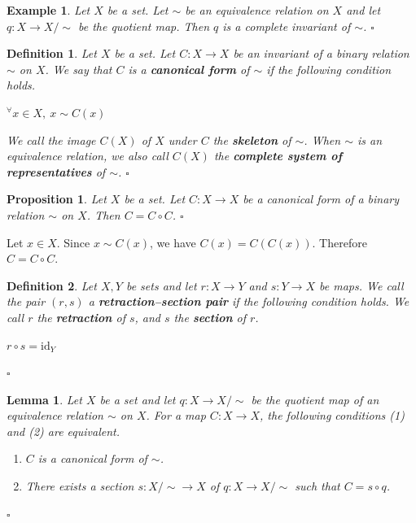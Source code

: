 \documentclass{article}
\makeatletter
\theoremstyle{noperiod}
\newtheorem{definition}{Definition}
\newtheorem{proposition}{Proposition}
\newtheorem{lemma}{Lemma}
\newtheorem{example}{Example}
\renewenvironment{proof}[1][\proofname]{\par
  \pushQED{\qed}
  \normalfont \topsep6\p@\@plus6\p@\relax
  \trivlist
  \item[\hskip\labelsep
        \itshape
    #1 ]\ignorespaces
}{
  \popQED\endtrivlist\@endpefalse
}
\renewcommand{\proofname}{\bfseries Proof}
\makeatother
\begin{document}
\begin{example}
Let $X$ be a set. Let $\sim$ be an equivalence relation on $X$ and let
$q \colon X \to X/\sim$ be the quotient map. Then $q$ is a complete invariant
of $\sim$.
\hfill $\square$
\end{example}

\begin{definition}
Let $X$ be a set. Let $C \colon X \to X$ be an invariant of a binary
relation $\sim$ on $X$. We say that $C$ is a \textbf{canonical form} of $\sim$
if the following condition holds.
\begin{center}
  ${^{\forall}x} \in X,\ x \sim C(x)$
\end{center}
We call the image $C(X)$ of $X$ under $C$ the \textbf{skeleton} of $\sim$.
When $\sim$ is an equivalence relation, we also call $C(X)$ the
\textbf{complete system of representatives} of $\sim$.
\hfill $\square$
\end{definition}

\begin{proposition}
Let $X$ be a set. Let $C \colon X \to X$ be a canonical form of a binary
relation $\sim$ on $X$. Then $C = C \circ C$.
\hfill $\square$
\end{proposition}

\begin{proof}
Let $x \in X$. Since $x \sim C(x)$, we have $C(x) = C(C(x))$. Therefore
$C = C \circ C$.
\end{proof}

\begin{definition}
Let $X, Y$ be sets and let $r \colon X \to Y$ and $s \colon Y \to X$ be maps.
We call the pair $(r, s)$ a \textbf{retraction--section pair} if the following
condition holds. We call $r$ the \textbf{retraction} of $s$, and $s$ the
\textbf{section} of $r$.
\begin{center}
  $r \circ s = \mathrm{id}_Y$
\end{center}
\hfill $\square$
\end{definition}

\begin{lemma}
Let $X$ be a set and let $q \colon X \to X/\sim$ be the quotient map of an
equivalence relation $\sim$ on $X$. For a map $C \colon X \to X$, the following
conditions \textup{(1)} and \textup{(2)} are equivalent.
\def\labelenumi{(\theenumi)}
\begin{enumerate}
  \item $C$ is a canonical form of $\sim$.
  \item There exists a section $s \colon X/\sim \to X$ of $q \colon X \to X/\sim$
        such that $C = s \circ q$.
\end{enumerate}
\hfill $\square$
\end{lemma}
\end{document}
